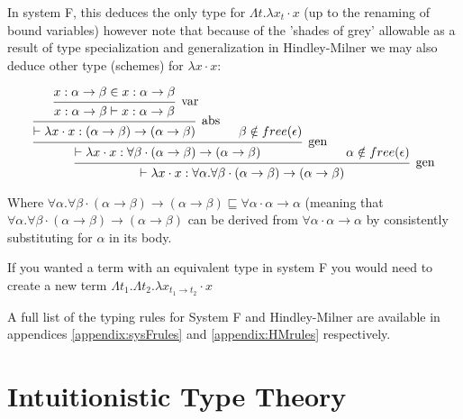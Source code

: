 \documentclass{ProgressReport}[2020/09/15]
\begin{document}
            In system F, this deduces the only type for $\Lambda t . \lambda x_t
            \cdot x$ (up to the renaming of bound variables) however note that
            because of the 'shades of grey' allowable as a result of type
            specialization and generalization in Hindley-Milner we may
            also deduce other type (schemes) for $\lambda x \cdot x$:
            
            \[\begin{array}{c}
            \mbox{\begin{prooftree}
                        \hypo{x : \alpha \to \beta \in x : \alpha \to \beta}
                    \infer1[var]{x : \alpha \to \beta \vdash x : \alpha \to \beta}   
                    \infer1[abs]{\vdash \lambda x \cdot x : (\alpha \to \beta) \to
                    (\alpha \to \beta)}
                    \hypo{\beta \notin free(\epsilon)}        
                \infer2[gen]{\vdash \lambda x \cdot x : \forall \beta \cdot
                  (\alpha \to \beta) \to (\alpha \to \beta)}
                \hypo{\alpha \notin free(\epsilon)}
               \infer2[gen]{\vdash \lambda x \cdot x : \forall \alpha . \forall
                 \beta \cdot (\alpha \to \beta) \to (\alpha \to \beta)}
            \end{prooftree}}
            \end{array} \]
            
            Where $\forall \alpha . \forall \beta \cdot
            (\alpha \to \beta) \to (\alpha \to \beta) \sqsubseteq \forall \alpha \cdot
               \alpha \to \alpha$ (meaning that $\forall \alpha . \forall \beta \cdot
            (\alpha \to \beta) \to (\alpha \to \beta)$ can be derived
               from $\forall \alpha \cdot \alpha \to \alpha$ by
               consistently substituting for $\alpha$ in its body.
            
            If you wanted a term with an equivalent type in system F you would
            need to create a new term $\Lambda t_1 . \Lambda t_2 . \lambda x_{t_1
              \to t_2} \cdot x$
            
            A full list of the typing rules for System F and Hindley-Milner are
            available in appendices \ref{appendix:sysFrules} and
            \ref{appendix:HMrules} respectively.
                    
          \section{Intuitionistic Type Theory}
        
\end{document}
